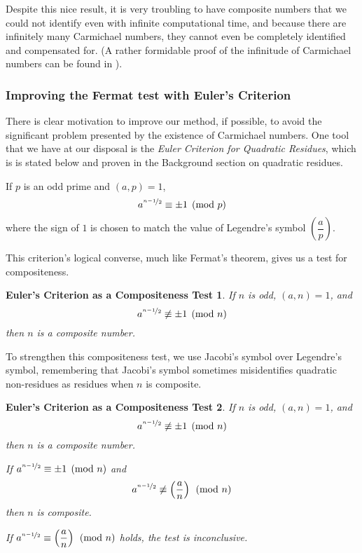 \documentclass{article}
\begin{document}
\par Despite this nice result, it is very troubling to have composite numbers that we could not identify even with infinite computational time, and because there are infinitely many Carmichael numbers, they cannot even be completely identified and compensated for. (A rather formidable  proof of the infinitude of Carmichael  numbers can be found in \citep{carmichael}).


\subsubsection*{Improving the Fermat test with Euler's Criterion}

There is clear motivation to improve our method, if possible, to avoid the significant problem presented by the existence of Carmichael numbers. One tool that we have at our disposal is the \textit{Euler Criterion for Quadratic Residues}, which is is stated below and proven in the Background section on quadratic residues.

\newtheorem*{eulerconverse}{Euler's Criterion as a Compositeness Test}

\begin{eulercriterion}
If $p$ is an odd prime and $(a,p) = 1$, 
$$a^{\nicefrac{n-1}{2}} \equiv \pm 1 \pmod p$$
where the sign of $1$ is chosen to match the value of Legendre's symbol $\left(\dfrac{a}{p} \right)$.
\end{eulercriterion}


This criterion's logical converse, much like Fermat's theorem, gives us a test for compositeness.
\begin{eulerconverse}
If $n$ is odd, $(a,n) = 1$, and
	$$a^{\nicefrac{n-1}{2}} \not\equiv \pm 1 \pmod n$$
	then $n$ is a composite number.
\end{eulerconverse}

To strengthen this compositeness test, we use Jacobi's symbol over Legendre's symbol, remembering that Jacobi's symbol sometimes misidentifies quadratic non-residues as residues when $n$ is composite.

\begin{eulerconverse}
If $n$ is odd, $(a,n) = 1$, and
	$$a^{\nicefrac{n-1}{2}} \not\equiv \pm 1 \pmod n$$
	then $n$ is a composite number.
	
\par If $a^{\nicefrac{n-1}{2}} \equiv \pm 1 \pmod n$ and
	$$a^{\nicefrac{n-1}{2}} \not\equiv \left(\dfrac{a}{n}\right) \pmod n$$
	then $n$ is composite. \\
\par
 If $a^{\nicefrac{n-1}{2}} \equiv \left(\dfrac{a}{n}\right) \pmod n$ holds, the test is inconclusive.
\end{eulerconverse}
\end{document}
